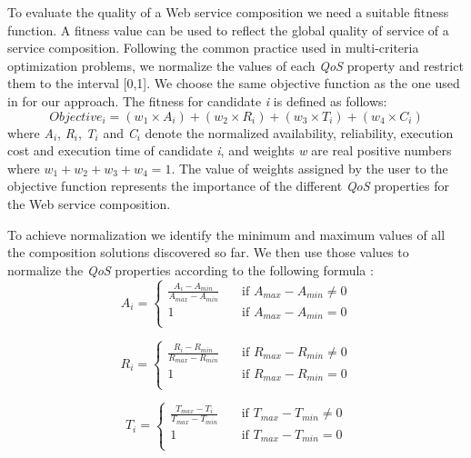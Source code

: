 To evaluate the quality of a Web service composition we need a suitable fitness function. A fitness value can be used to reflect the global quality of service of a service composition. Following the common practice  \cite{19,14,4} used in multi-criteria optimization problems, we normalize the values of each \emph{QoS} property and restrict them to the interval [0,1]. We choose the same objective function as the one used in \cite{19,4} for our approach. The fitness for candidate \emph{i} is defined as follows:
\begin{equation}
Objective_{i}=(w_{1} \times A_{i}) + (w_{2} \times R_{i}) + (w_{3} \times T_{i}) + (w_{4} \times C_{i})
\end{equation}
\noindent
where \emph{A$_{i}$}, \emph{R$_{i}$}, \emph{T$_{i}$} and  \emph{C$_{i}$} denote the normalized availability, reliability,  execution cost and  execution time of candidate \emph{i}, and weights \emph{w} are real positive numbers where $w_{1} + w_{2} + w_{3} + w_{4} = 1$. The value of weights assigned by the user to the objective function represents the importance of the different \emph{QoS} properties for the Web service composition. \par

To achieve normalization we identify the minimum and maximum values of all the composition solutions discovered so far. We then use those values to normalize the \emph{QoS} properties according to the following formula \cite{4}:
\begin{equation}
A_i = \left\{
\begin{split}
    \frac{A_i - A_{min}}{A_{max} - A_{min}}      & \quad \text{if  } A_{max} - A_{min} \neq 0\\
    1  & \quad \text{if  } A_{max} - A_{min} = 0\\
\end{split}\right. 
\end{equation}

\begin{equation}
R_i = \left\{
\begin{split}
   \frac{R_i - R_{min}}{R_{max} - R_{min}}      & \quad \text{if  } R_{max} - R_{min} \neq 0\\
    1  & \quad \text{if  } R_{max} - R_{min} = 0\\
\end{split}\right. 
\end{equation}

\begin{equation}
T_i = \left\{
\begin{split}
    \frac{T_{max} - T_i}{T_{max} - T_{min}}      & \quad \text{if  } T_{max} - T_{min} \neq 0\\
    1  & \quad \text{if  } T_{max} - T_{min} = 0\\
\end{split}\right. 
\end{equation}

